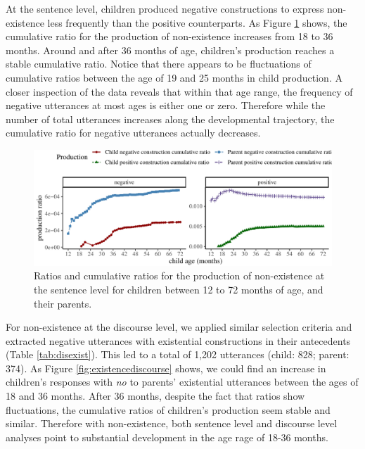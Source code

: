 \documentclass[
  english,
  man,floatsintext]{apa6}
\begin{document}
At the sentence level, children produced negative constructions to express non-existence less frequently than the positive counterparts. As Figure \ref{fig:existence} shows, the cumulative ratio for the production of non-existence increases from 18 to 36 months. Around and after 36 months of age, children's production reaches a stable cumulative ratio. Notice that there appears to be fluctuations of cumulative ratios between the age of 19 and 25 months in child production. A closer inspection of the data reveals that within that age range, the frequency of negative utterances at most ages is either one or zero. Therefore while the number of total utterances increases along the developmental trajectory, the cumulative ratio for negative utterances actually decreases.

\begin{figure}[H]

{\centering \includegraphics{neg_construction_article_files/figure-latex/existence-1} 

}

\caption{Ratios and cumulative ratios for the production of non-existence at the sentence level for children between 12 to 72 months of age, and their parents.}\label{fig:existence}
\end{figure}

For non-existence at the discourse level, we applied similar selection criteria and extracted negative utterances with existential constructions in their antecedents (Table \ref{tab:disexist}). This led to a total of 1,202 utterances (child: 828; parent: 374). As Figure \ref{fig:existencediscourse} shows, we could find an increase in children's responses with \emph{no} to parents' existential utterances between the ages of 18 and 36 months. After 36 months, despite the fact that ratios show fluctuations, the cumulative ratios of children's production seem stable and similar. Therefore with non-existence, both sentence level and discourse level analyses point to substantial development in the age rage of 18-36 months.
\end{document}
